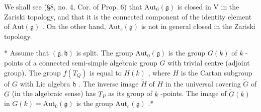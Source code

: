 We shall see (§8, no. 4, Cor. of Prop. 6) that \(\mathrm{Aut}_0(\mathfrak{g})\) is closed in V in the Zariski topology, and that it is the connected component of the identity element of \(\mathrm{Aut}(\mathfrak{g})\) . On the other hand, \(\mathrm{Aut}_e(\mathfrak{g})\) is not in general closed in the Zariski topology.

* Assume that \((\mathfrak{g},\mathfrak{h})\) is split. The group \(\mathrm{Aut}_0(\mathfrak{g})\) is the group \(G(k)\) of \(k\) -points of a connected semi-simple algebraic group \(G\) with trivial centre (adjoint group). The group \(f(T_{Q})\) is equal to \(H(k)\) , where \(H\) is the Cartan subgroup of \(G\) with Lie algebra \(\mathfrak{h}\) . The inverse image \(\tilde{H}\) of \(H\) in the universal covering \(\tilde{G}\) of \(G\) (in the algebraic sense) has \(T_{P}\) as its group of \(k\) -points. The image of \(\tilde{G}(k)\) in \(G(k) = \mathrm{Aut}_0(\mathfrak{g})\) is the group \(\mathrm{Aut}_e(\mathfrak{g})\) .*

